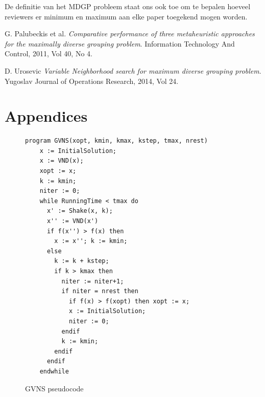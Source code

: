 \documentclass[pdftex,12pt,a4paper]{article}
\begin{document}
De definitie van het MDGP probleem staat ons ook toe om te bepalen hoeveel reviewers er minimum en maximum aan elke paper toegekend mogen worden. 

\newpage
\begin{thebibliography}{9}
  G. Palubeckis et al.
  \emph{Comparative performance of three metaheuristic approaches
for the maximally diverse grouping problem}.
  Information Technology And Control, 2011, Vol 40, No 4.
  
 D. Urosevic
 \emph{Variable Neighborhood search for maximum diverse grouping problem}.
 Yugoslav Journal of Operations Research, 2014, Vol 24.

\end{thebibliography}

\section{Appendices}
\begin{figure}[H]
\begin{verbatim}
program GVNS(xopt, kmin, kmax, kstep, tmax, nrest)
    x := InitialSolution;
    x := VND(x);
    xopt := x;
    k := kmin;
    niter := 0;
    while RunningTime < tmax do
      x' := Shake(x, k);
      x'' := VND(x')
      if f(x'') > f(x) then
        x := x''; k := kmin;
      else
        k := k + kstep;
        if k > kmax then
          niter := niter+1;
          if niter = nrest then
            if f(x) > f(xopt) then xopt := x;
            x := InitialSolution;
            niter := 0;
          endif
          k := kmin;
        endif
      endif
    endwhile
\end{verbatim}
\caption{GVNS pseudocode}
\label{apx:gvns_pseudocode}
\end{figure}
\end{document}
